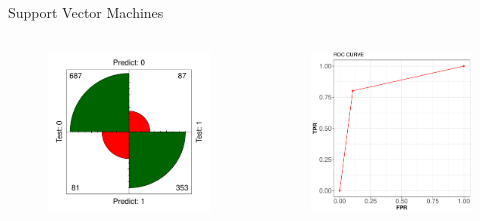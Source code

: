 \documentclass{beamer}
\begin{document}
\begin{frame}{Support Vector Machines}
\begin{columns}
  \begin{figure}[b]{\textwidth}
    \includegraphics[width=\textwidth]{Pic/SVM_confusion.pdf}
  \end{figure} 
  \begin{figure}[b]{\textwidth}
    \includegraphics[width=\textwidth]{Pic/ROC_SVM.pdf}
  \end{figure}
\end{columns}
\end{frame}
\end{document}
